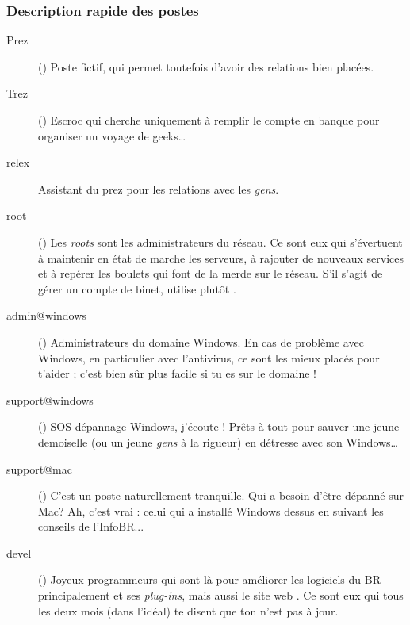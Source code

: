 \subsubsection*{Description rapide des postes}

\begin{description}

  \item[Prez]{() Poste fictif, qui permet toutefois d'avoir
des relations bien plac\'ees.}

  \item[Trez]{() Escroc qui cherche uniquement \`a remplir le compte en banque pour organiser un voyage de geeks\dots}

  \item[relex]{Assistant du prez pour les relations avec les \emph{gens}.}

  \item[root]{() Les \emph{roots} sont les administrateurs du r\'eseau. Ce sont eux qui s'\'evertuent \`a maintenir en \'etat de marche les serveurs, \`a rajouter de nouveaux services et \`a rep\'erer les boulets qui font de la merde sur le r\'eseau. S'il s'agit de g\'erer un compte de binet, utilise plut\^ot .}

  \item[admin@windows] {() Administrateurs du domaine Windows. En cas de probl\`eme avec Windows, en particulier avec l'antivirus, ce sont les mieux plac\'es pour t'aider ; c'est bien s\^ur  plus facile si tu es sur le domaine !
}
  \item[support@windows] {() SOS d\'epannage Windows, j'\'ecoute ! Pr\^ets \`a tout pour sauver une jeune demoiselle (ou un jeune \emph{gens} \`a la rigueur) en d\'etresse avec son Windows\dots }

  \item[support@mac] {() C'est un poste naturellement tranquille. Qui a besoin d'\^etre d\'epann\'e sur Mac? Ah, c'est vrai : celui qui a install\'e Windows dessus en suivant les conseils de l'InfoBR... }

  \item[devel]{() Joyeux programmeurs qui sont l\`a pour am\'eliorer les logiciels du BR --- principalement  et ses \emph{plug-ins}, mais aussi le site web . Ce sont eux qui tous les deux mois (dans l'idéal) te disent que ton  n'est pas \`a jour.}


\end{description}

